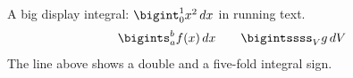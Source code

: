 \documentclass{article}
\begin{document}
A big display integral: $\bigint_{0}^{1} x^2\, dx$ in running text.
\[\bigints_{a}^{b} f(x)\, dx \qquad \bigintssss_{V} g\, dV\]
The line above shows a double and a five-fold integral sign.
\end{document}
